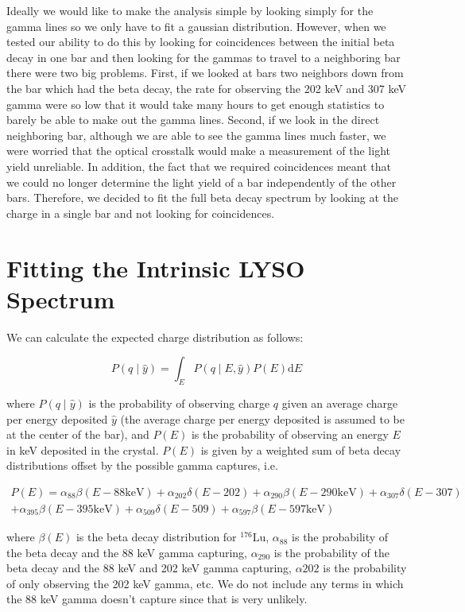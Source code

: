 \documentclass[12pt,openright,twoside]{report}
\begin{document}
Ideally we would like to make the analysis simple by looking simply for the
gamma lines so we only have to fit a gaussian distribution. However, when we
tested our ability to do this by looking for coincidences between the initial
beta decay in one bar and then looking for the gammas to travel to a
neighboring bar there were two big problems. First, if we looked at bars two
neighbors down from the bar which had the beta decay, the rate for observing
the 202 keV and 307 keV gamma were so low that it would take many hours to get
enough statistics to barely be able to make out the gamma lines. Second, if we
look in the direct neighboring bar, although we are able to see the gamma lines
much faster, we were worried that the optical crosstalk would make a
measurement of the light yield unreliable. In addition, the fact that we
required coincidences meant that we could no longer determine the light yield
of a bar independently of the other bars. Therefore, we decided to fit the full
beta decay spectrum by looking at the charge in a single bar and not looking
for coincidences.

\section{Fitting the Intrinsic LYSO Spectrum}
We can calculate the expected charge distribution as follows:

\begin{equation}
P(q\mid \hat{y}) = \int_E P(q\mid E, \hat{y}) P(E) \mathrm{d}E
\end{equation}

where $P(q\mid \hat{y})$ is the probability of observing charge $q$ given an
average charge per energy deposited $\hat{y}$ (the average charge per energy
deposited is assumed to be at the center of the bar), and $P(E)$ is the
probability of observing an energy $E$ in keV deposited in the crystal. $P(E)$
is given by a weighted sum of beta decay distributions offset by the possible
gamma captures, i.e.

\begin{multline}
P(E) = \alpha_{88} \beta(E-88 \mathrm{keV}) +
       \alpha_{202} \delta(E - 202) +
       \alpha_{290} \beta(E-290 \mathrm{keV}) +
       \alpha_{307} \delta(E - 307) \\
       + \alpha_{395} \beta(E-395 \mathrm{keV}) +
       \alpha_{509} \delta(E - 509) +
       \alpha_{597} \beta(E-597 \mathrm{keV})
\end{multline}

where $\beta(E)$ is the beta decay distribution for $^{176}\mathrm{Lu}$,
$\alpha_{88}$ is the probability of the beta decay and the 88 keV gamma
capturing, $\alpha_{290}$ is the probability of the beta decay and the 88 keV
and 202 keV gamma capturing, $\alpha{202}$ is the probability of only observing
the 202 keV gamma, etc. We do not include any terms in which the 88 keV gamma
doesn't capture since that is very unlikely\cite{sanchez}.
\end{document}
